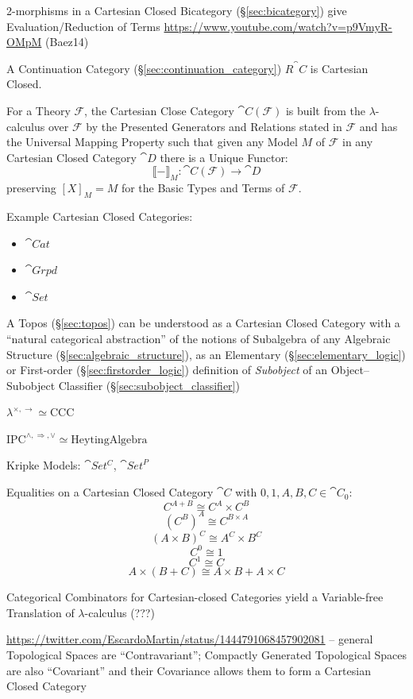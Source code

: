2-morphisms in a Cartesian Closed Bicategory (\S\ref{sec:bicategory})
give Evaluation/Reduction of Terms
\url{https://www.youtube.com/watch?v=p9VmyR-OMpM} (Baez14)

A Continuation Category (\S\ref{sec:continuation_category})
$R^\cat{C}$ is Cartesian Closed.

For a Theory $\mathcal{F}$, the Cartesian Close Category
$\cat{C}(\mathcal{F})$ is built from the $\lambda$-calculus over
$\mathcal{F}$ by the Presented Generators and Relations stated in
$\mathcal{F}$ and has the Universal Mapping Property such that given
any Model $M$ of $\mathcal{F}$ in any Cartesian Closed Category
$\cat{D}$ there is a Unique Functor:
\[
  \llbracket - \rrbracket_M :
    \cat{C}(\mathcal{F}) \rightarrow \cat{D}
\]
preserving $[X]_M = M$ for the Basic Types and Terms of $\mathcal{F}$.
\cite{awodey06}

Example Cartesian Closed Categories:
\begin{itemize}
\item $\cat{Cat}$
\item $\cat{Grpd}$
\item $\cat{Set}$
\end{itemize}

\fist A Topos (\S\ref{sec:topos}) can be understood as a Cartesian Closed
Category with a ``natural categorical abstraction'' of the notions of
Subalgebra of any Algebraic Structure (\S\ref{sec:algebraic_structure}), as an
Elementary (\S\ref{sec:elementary_logic}) or First-order
(\S\ref{sec:firstorder_logic}) definition of \emph{Subobject} of an Object--
Subobject Classifier (\S\ref{sec:subobject_classifier})

$\lambda^{\times, \rightarrow} \simeq \mathrm{CCC}$

$\mathrm{IPC}^{\wedge, \Rightarrow, \vee} \simeq \mathrm{Heyting Algebra}$

Kripke Models: $\cat{Set^C}$, $\cat{Set}^P$ %

Equalities on a Cartesian Closed Category $\cat{C}$ with
$0,1,A,B,C \in \cat{C}_0$:
\[
  C^{A + B} \cong C^A \times C^B
\]\[
  (C^B)^A \cong C^{B \times A}
\]\[
  (A \times B)^C \cong A^C \times B^C
\]\[
  C^0 \cong 1
\]\[
  C^1 \cong C
\]\[
  A \times (B + C) \cong A \times B + A \times C
\]

Categorical Combinators for Cartesian-closed Categories yield a
Variable-free Translation of $\lambda$-calculus (???)

\url{https://twitter.com/EscardoMartin/status/1444791068457902081} -- general
Topological Spaces are ``Contravariant''; Compactly Generated Topological Spaces
are also ``Covariant'' and their Covariance allows them to form a Cartesian
Closed Category



